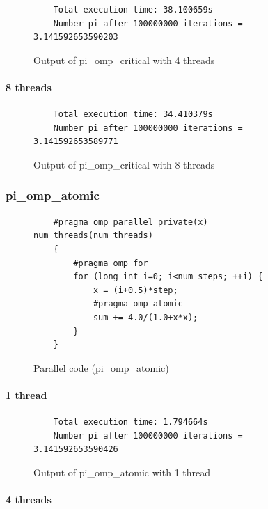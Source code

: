\documentclass[12pt, a4paper]{article}
\begin{document}
\begin{figure}[H]
	\begin{lstlisting}
	Total execution time: 38.100659s
	Number pi after 100000000 iterations = 3.141592653590203		
	\end{lstlisting}
	\caption{Output of pi\_omp\_critical with 4 threads}
\end{figure}

\paragraph{8 threads}

\begin{figure}[H]
	\begin{lstlisting}
	Total execution time: 34.410379s
	Number pi after 100000000 iterations = 3.141592653589771		
	\end{lstlisting}
	\caption{Output of pi\_omp\_critical with 8 threads}
\end{figure}

\subsubsection{pi\_omp\_atomic}

\begin{figure}[H]
	\begin{lstlisting}
	#pragma omp parallel private(x) num_threads(num_threads)
    {
        #pragma omp for 
        for (long int i=0; i<num_steps; ++i) {
            x = (i+0.5)*step;
            #pragma omp atomic 
	    	sum += 4.0/(1.0+x*x);
        }
    }
	\end{lstlisting}
	
	\caption{Parallel code (pi\_omp\_atomic)}
\end{figure}

\paragraph{1 thread}

\begin{figure}[H]
	\begin{lstlisting}
	Total execution time: 1.794664s
	Number pi after 100000000 iterations = 3.141592653590426		
	\end{lstlisting}
	\caption{Output of pi\_omp\_atomic with 1 thread}
\end{figure}

\paragraph{4 threads}
\end{document}
